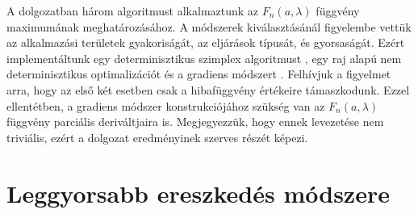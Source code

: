 \documentclass[oneside,titlepage,12pt,a4paper]{report}
\begin{document}
 A dolgozatban h\'arom algoritmust alkalmaztunk az $F_n(a,\lambda)$ függvény maximumának meghatározásához. A módszerek kiválasztásánál figyelembe vettük az alkalmazási területek gyakoriságát, az eljárások típusát, és gyorsaságát. Ezért implementáltunk egy determinisztikus szimplex algoritmust \cite{NelderMeadSimplex}, egy raj alapú nem determinisztikus optimalizációt \cite{basic_pso} és a gradiens módszert \cite{numopt}. Felhívjuk a figyelmet arra, hogy az első két esetben csak a hibafüggvény értékeire támaszkodunk. Ezzel ellentétben, a gradiens módszer konstrukciójához szükség van az $F_n(a,\lambda)$ függvény parciális deriváltjaira is. Megjegyezzük, hogy ennek levezetése nem triviális, ezért a dolgozat eredményinek szerves részét képezi.     

\section{Leggyorsabb ereszked\'es m\'odszere}
\end{document}
